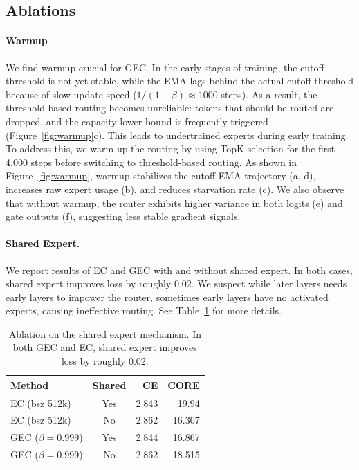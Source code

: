 \documentclass{article}
\theoremstyle{plain}
\theoremstyle{definition}
\theoremstyle{remark}
\begin{document}
\subsection{Ablations}

\paragraph{Warmup}

We find warmup crucial for GEC. In the early stages of training, the cutoff threshold is not yet stable, while the EMA lags behind the actual cutoff threshold because of slow update speed ($1/(1-\beta) \approx 1000$ steps). As a result, the threshold-based routing becomes unreliable: tokens that should be routed are dropped, and the capacity lower bound is frequently triggered (Figure~\ref{fig:warmup}c). This leads to undertrained experts during early training. To address this, we warm up the routing by using TopK selection for the first 4,000 steps before switching to threshold-based routing. As shown in Figure~\ref{fig:warmup}, warmup stabilizes the cutoff-EMA trajectory (a, d), increases raw expert usage (b), and reduces starvation rate (c). We also observe that without warmup, the router exhibits higher variance in both logits (e) and gate outputs (f), suggesting less stable gradient signals.

\paragraph{Shared Expert.}

We report results of EC and GEC with and without shared expert. In both cases, shared expert improves loss by roughly 0.02. We suspect while later layers needs early layers to impower the router, sometimes early layers have no activated experts, causing ineffective routing. See Table~\ref{tab:shared_expert_ablation} for more details.

\begin{table}[h]
\centering
\caption{Ablation on the shared expert mechanism. In both GEC and EC, shared expert improves loss by roughly 0.02. }
\label{tab:shared_expert_ablation}
\small
\setlength{\tabcolsep}{4pt}
\begin{tabularx}{\columnwidth}{@{}>{\raggedright\arraybackslash}X c r r@{}}
\toprule
\textbf{Method} & \textbf{Shared} & \textbf{CE} & \textbf{CORE} \\
\midrule
EC (bsz 512k) & Yes & 2.843 & 19.94 \\
EC (bsz 512k) & No  & 2.862 & 16.307\\
\midrule
GEC ($\beta{=}0.999$) & Yes & 2.844 & 16.867 \\
GEC ($\beta{=}0.999$) & No  & 2.862 & 18.515 \\
\bottomrule
\end{tabularx}
\end{table}
\end{document}
